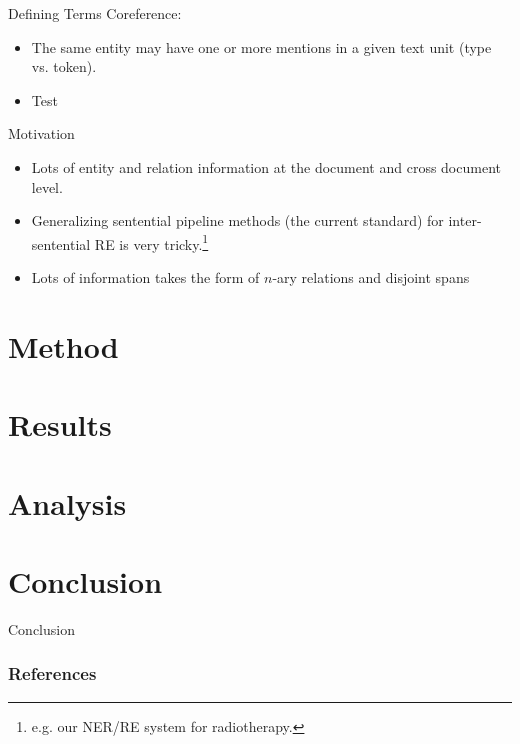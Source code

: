 \documentclass[usenames,dvipsnames,pdf]{beamer}
\begin{document}
        \begin{frame}{Defining Terms}
          Coreference:
          \begin{itemize}
          \item
            The same entity may have one or more mentions in a given text unit (type vs. token).
          \item
            Test
          \end{itemize}
        \end{frame}
        
        \begin{frame}{Motivation}
          \begin{itemize}
          \item
            Lots of entity and relation information at the document and cross document level.
          \item
            Generalizing sentential pipeline methods (the current standard) for inter-sentential RE is very tricky.\footnote{e.g. our NER/RE system for radiotherapy.}
          \item
            Lots of information takes the form of $n$-ary relations and disjoint spans
          \end{itemize}
        \end{frame}
        
        \section{Method}
        
        \section{Results}
        
        \section{Analysis}
        
        \section{Conclusion}

        \begin{frame}{Conclusion}
        \end{frame}

        \begin{frame}[allowframebreaks]
          \frametitle{References}
          
          
        \end{frame}
      
\end{document}
